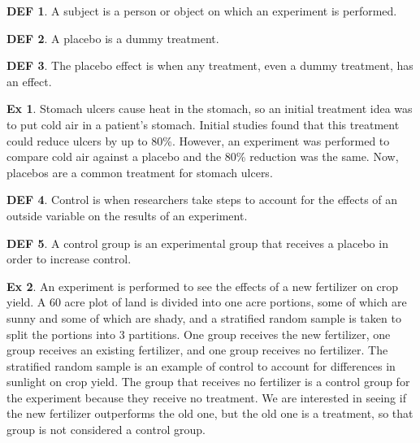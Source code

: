 \documentclass{article}
\theoremstyle{definition}\newtheorem{definition}{DEF}
\theoremstyle{definition}\newtheorem{example}{Ex}
\theoremstyle{lemma}\newtheorem{lemma}{Lemma}
\theoremstyle{corrolary}\newtheorem{corrolary}{Cor}
\begin{document}
\begin{definition}
A subject is a person or object on which an experiment is performed.
\end{definition}

\begin{definition}
A placebo is a dummy treatment.
\end{definition}

\begin{definition}
The placebo effect is when any treatment, even a dummy treatment, has an effect.
\end{definition}

\begin{example}
Stomach ulcers cause heat in the stomach, so an initial treatment idea was to put cold air in a patient's stomach.
Initial studies found that this treatment could reduce ulcers by up to 80\%.
However, an experiment was performed to compare cold air against a placebo and the 80\% reduction was the same.
Now, placebos are a common treatment for stomach ulcers.
\end{example}

\begin{definition}
Control is when researchers take steps to account for the effects of an outside variable on the results of an experiment.
\end{definition}

\begin{definition}
A control group is an experimental group that receives a placebo in order to increase control.
\end{definition}

\begin{example}
An experiment is performed to see the effects of a new fertilizer on crop yield.
A 60 acre plot of land is divided into one acre portions, some of which are sunny and some of which are shady, and a stratified random sample is taken to split the portions into 3 partitions.
One group receives the new fertilizer, one group receives an existing fertilizer, and one group receives no fertilizer.
The stratified random sample is an example of control to account for differences in sunlight on crop yield.
The group that receives no fertilizer is a control group for the experiment because they receive no treatment.
We are interested in seeing if the new fertilizer outperforms the old one, but the old one is a treatment, so that group is not considered a control group.
\end{example}
\end{document}
